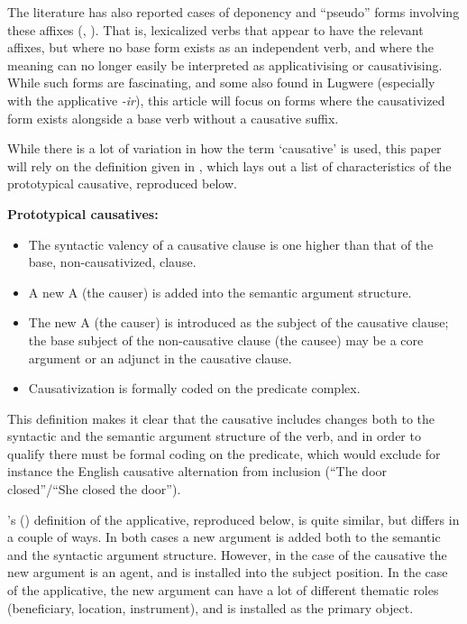 \documentclass[output=paper,colorlinks,citecolor=brown,draftmode]{langscibook}
\begin{document}
The literature has also reported cases of deponency and ``pseudo'' forms involving these affixes (\citealt{deponencyGood}, \citealt{pacchiarotti2020bantu}). That is, lexicalized verbs that appear to have the relevant affixes, but where no base form exists as an independent verb, and where the meaning can no longer easily be interpreted as applicativising or causativising. While such forms are fascinating, and some also found in Lugwere (especially with the applicative \emph{-ir}), this article will focus on forms where the causativized form exists alongside a base verb without a causative suffix.  

While there is a lot of variation in how the term `causative' is used, this paper will rely on the definition given in \citet{zuniga2019grammatical}, which lays out a list of characteristics of the prototypical causative, reproduced below.

\ea 
\textbf{Prototypical causatives:}
\begin{itemize}
    \item The syntactic valency of a causative clause is one higher than that of the base, non-causativized, clause.
    \item A new A (the causer) is added into the semantic argument structure. 
    \item The new A (the causer) is introduced as the subject of the causative clause; the base subject of the non-causative clause (the causee) may be a core argument or an adjunct in the causative clause.
    \item Causativization is formally coded on the predicate complex. 
\end{itemize}
\z 

This definition makes it clear that the causative includes changes both to the syntactic and the semantic argument structure of the verb, and in order to qualify there must be formal coding on the predicate, which would exclude for instance the English causative alternation from inclusion (``The door closed''/``She closed the door'').

\citeauthor{zuniga2019grammatical}'s (\citeyear{zuniga2019grammatical}) definition of the applicative, reproduced below, is quite similar, but differs in a couple of ways. In both cases a new argument is added both to the semantic and the syntactic argument structure. However, in the case of the causative the new argument is an agent, and is installed into the subject position. In the case of the applicative, the new argument can have a lot of different thematic roles (beneficiary, location, instrument), and is installed as the primary object. 
\end{document}
